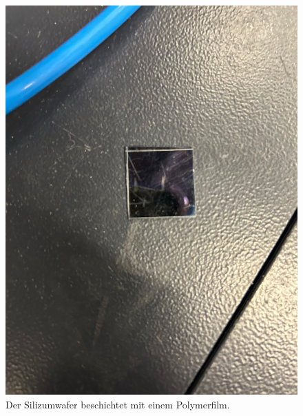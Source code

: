\begin{figure}[H]
    \includegraphics[width=\textwidth]{bilder/probe.jpeg}
    \caption{Der Silizumwafer beschichtet mit einem Polymerfilm.}
    \label{fig:Abbildung 6}
\end{figure}

